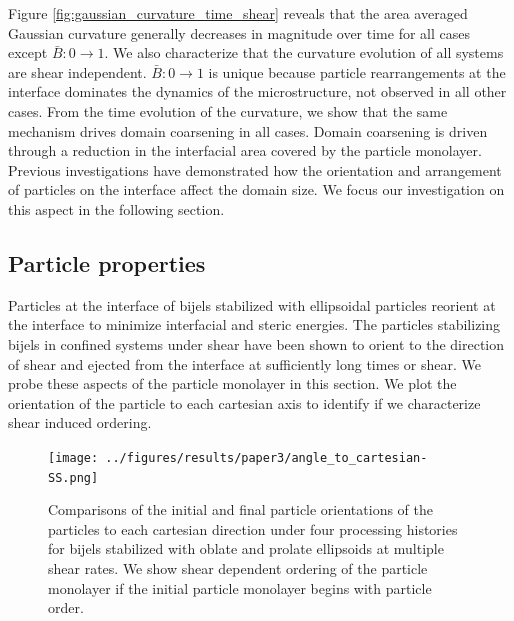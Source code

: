 Figure \ref{fig:gaussian_curvature_time_shear} reveals that the area averaged Gaussian curvature generally decreases in magnitude over time for all cases except 
$\bar{B}: 0 \to 1$. We also characterize that the curvature evolution of all systems are shear independent. $\bar{B}: 0 \to 1$ is
unique because particle rearrangements at the interface dominates the dynamics of the microstructure, not observed in all other
cases. From the time evolution of the curvature, we show that the same mechanism drives domain coarsening in all cases. Domain
coarsening is driven through a reduction in the interfacial area covered by the particle monolayer. Previous investigations have 
demonstrated how the orientation and arrangement of particles on the interface affect the domain size. 
\cite{gunther_timescales_2014} We focus our investigation on this aspect in the following section. 

\subsection{Particle properties}

Particles at the interface of bijels stabilized with ellipsoidal particles reorient at the interface to minimize interfacial and
steric energies. \cite{gunther_timescales_2014} The particles stabilizing bijels in confined systems under shear have been shown to
orient to the direction of shear and ejected from the interface at sufficiently long times or shear.\cite{bonaccorso_shear_2020} 
We probe these aspects of the particle monolayer in this section. We plot the orientation of the particle to each cartesian axis 
to identify if we characterize shear induced ordering.

\begin{figure} 
    \centering 
    \texttt{[image: ../figures/results/paper3/angle\_to\_cartesian-SS.png]} 
    \caption{Comparisons of the initial and final particle orientations of the particles to each cartesian direction under
             four processing histories for bijels stabilized with oblate and prolate ellipsoids at multiple shear rates. We show
             shear dependent ordering of the particle monolayer if the initial particle monolayer begins with particle order.} 
    \label{fig:particle_orientation_cartesian_shear} 
\end{figure}

